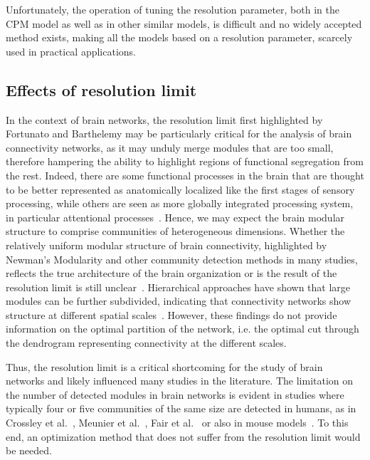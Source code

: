 Unfortunately, the operation of tuning the resolution parameter, both in the CPM model as well as in other similar models, is difficult and no widely accepted method exists, making all the models based on a resolution parameter, scarcely used in practical applications.

\subsection{Effects of resolution limit}
In the context of brain networks, the resolution limit first highlighted by Fortunato and Barthelemy may be particularly critical for the analysis of brain connectivity networks, as it may unduly merge modules that are too small, therefore hampering the ability to highlight regions of functional segregation from the rest. Indeed, there are some functional processes in the brain that are thought to be better represented as anatomically localized like the first stages of sensory processing, while others are seen as more globally integrated processing system, in particular attentional processes~\cite{alnaes2015}.
Hence, we may expect the brain modular structure to comprise communities of heterogeneous dimensions.
Whether the relatively uniform modular structure of brain connectivity, highlighted by Newman's Modularity and other community detection methods in many studies, reflects the true architecture of the brain organization or is the result of the resolution limit is still unclear~\cite{nicolini2016}.
Hierarchical approaches have shown that large modules can be further subdivided, indicating that connectivity networks show structure at different spatial scales~\cite{meunier2009}.
However, these findings do not provide information on the optimal partition of the network, i.e. the optimal cut through the dendrogram representing connectivity at the different scales.

Thus, the resolution limit is a critical shortcoming for the study of brain networks and likely influenced many studies in the literature.
The limitation on the number of detected modules in brain networks is evident in studies where typically four or five communities of the same size are detected in humans, as in Crossley et al.~\cite{crossley2013a}, Meunier et al.~\cite{meunier2009a,meunier2010}, Fair et al.~\cite{fair2009} or also in mouse models~\cite{schwarz2008}.
To this end, an optimization method that does not suffer from the resolution limit would be needed.

